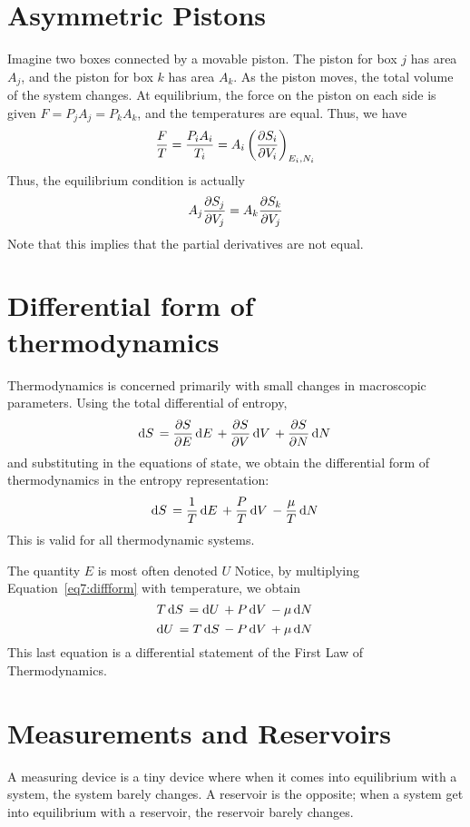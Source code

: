 \section{Asymmetric Pistons}
Imagine two boxes connected by a movable piston. 
The piston for box \(j\) has area \(A_j\), and the piston for box \(k\) has area \(A_k\).
As the piston moves, the total volume of the system changes.
At equilibrium, the force on the piston on each side is given \(F = P_jA_j = P_kA_k\), and the temperatures are equal.
Thus, we have
\[\frac{F}{T}=\frac{P_iA_i}{T_i}=A_i\left(\frac{\partial S_i}{\partial V_i}\right)_{E_i, N_i}\]
Thus, the equilibrium condition is actually
\begin{equation}
	A_j \frac{\partial S_j}{\partial V_j}=A_k\frac{\partial S_k}{\partial V_j}
\end{equation}
Note that this implies that the partial derivatives are not equal.

\section{Differential form of thermodynamics}
Thermodynamics is concerned primarily with small changes in macroscopic parameters. Using the total differential of entropy,
\[\d{S}=\pder{S}{E}\d{E}+\pder{S}{V}\d{V}+\pder{S}{N}\d{N}\]
and substituting in the equations of state, we obtain the differential form of thermodynamics in the entropy representation:
\begin{equation}
	\d{S}=\frac{1}{T}\d{E}+\frac{P}{T}\d{V}-\frac{\mu}{T}\d{N}\label{eq7:diffform}
\end{equation}
This is valid for all thermodynamic systems. 
\begin{aside}[1st Law]
	The quantity \(E\) is most often denoted \(U\) Notice, by multiplying Equation~\ref{eq7:diffform} with temperature, we obtain
	\[T\d{S} = \d{U}+P\d{V}-\mu\d{N}\]
	\[\d{U}=T\d{S}-P\d{V}+\mu\d{N}\]
	This last equation is a differential statement of the First Law of Thermodynamics.
\end{aside}
\section{Measurements and Reservoirs}
A measuring device is a tiny device where when it comes into equilibrium with a system, the system barely changes. A reservoir is the opposite; when a system get into equilibrium with a reservoir, the reservoir barely changes.
